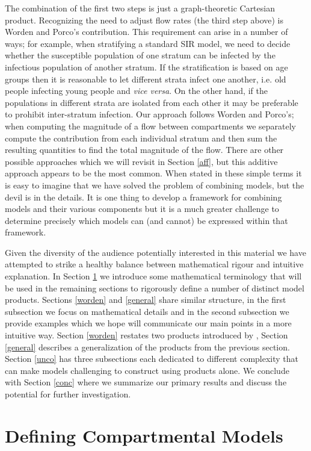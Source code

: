 \documentclass{article}
\theoremstyle{definition}
\newcommand{\vv}{{\emph{vice versa}\xspace}}
\begin{document}
The combination of the first two steps is just a graph-theoretic Cartesian product. Recognizing the need to adjust flow rates (the third step above) is Worden and Porco's contribution. This requirement can arise in a number of ways; for example, when stratifying a standard SIR model, we need to decide whether the susceptible population of one stratum can be infected by the infectious population of another stratum.
If the stratification is based on age groups then it is reasonable to let different strata infect one another, i.e. old people infecting young people and \vv. On the other hand, if the populations in different strata are isolated from each other it may be preferable to prohibit inter-stratum infection. Our approach follows Worden and Porco's; when computing the magnitude of a flow between compartments we separately compute the contribution from each individual stratum and then sum the resulting quantities to find the total magnitude of the flow. There are other possible approaches which we will revisit in Section \ref{aff}, but this additive approach appears to be the most common. When stated in these simple terms it is easy to imagine that we have solved the problem of combining models, but the devil is in the details. It is one thing to develop a framework for combining models and their various components but it is a much greater challenge to determine precisely which models can (and cannot) be expressed within that framework. 

Given the diversity of the audience potentially interested in this material we have attempted to strike a healthy balance between mathematical rigour and intuitive explanation. In Section \ref{dcm} we introduce some mathematical terminology that will be used in the remaining sections to rigorously define a number of distinct model products. Sections \ref{worden} and \ref{general} share similar structure, in the first subsection we focus on mathematical details and in the second subsection we provide examples which we hope will communicate our main points in a more intuitive way. Section \ref{worden} restates two products introduced by \cite{worden2017products}, Section \ref{general} describes a generalization of the products from the previous section. Section \ref{unco} has three subsections each dedicated to different complexity that can make models challenging to construct using products alone. We conclude with Section \ref{conc} where we summarize our primary results and discuss the potential for further investigation.

\section{Defining Compartmental Models}\label{dcm}
\end{document}
